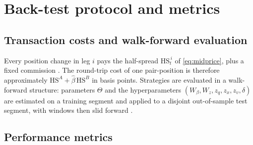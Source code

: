 
\section{Back-test protocol and metrics}\label{sec:backtest}

\subsection{Transaction costs and walk-forward evaluation}\label{sec:walkforward}

Every position change in leg $i$ pays the half-spread $\mathrm{HS}_t^{\,i}$ of \eqref{eq:midprice}, plus a fixed commission \parencite{aldridge2013hft,lopezdeprado2018advances}. The round-trip cost of one pair-position is therefore approximately $\mathrm{HS}^{A} + \hat\beta\,\mathrm{HS}^{B}$ in basis points. Strategies are evaluated in a walk-forward structure: parameters $\Theta$ and the hyperparameters $(W_\beta, W_z, z_q, z_x, z_v, \delta)$ are estimated on a training segment and applied to a disjoint out-of-sample test segment, with windows then slid forward \parencite{lopezdeprado2018advances,hautsch2012econometrics}.

\subsection{Performance metrics}\label{sec:metrics}

